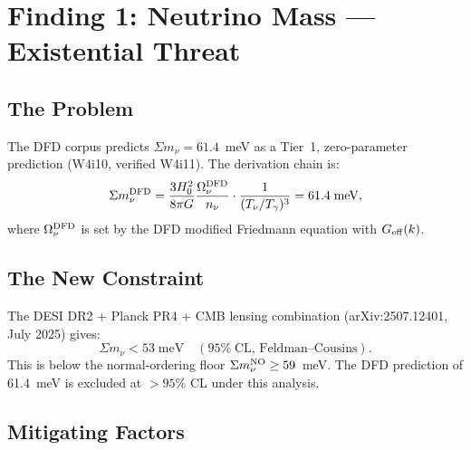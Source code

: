 \documentclass[11pt]{article}
\newcommand{\Geff}{G_{\rm eff}}
\newcommand{\Hzero}{H_0}
\begin{document}
\section{Finding 1: Neutrino Mass --- Existential Threat}
\label{sec:neutrino}

\subsection{The Problem}

The DFD corpus predicts $\Sigma m_\nu = 61.4$~meV as a Tier~1,
zero-parameter prediction (W4i10, verified W4i11).  The derivation
chain is:
\begin{equation}
\Sigma m_\nu^{\rm DFD} = \frac{3 \Hzero^2}{8\pi G}
\frac{\Omega_\nu^{\rm DFD}}{n_\nu}
\cdot \frac{1}{(T_\nu/T_\gamma)^3}
= 61.4 \;\text{meV},
\end{equation}
where $\Omega_\nu^{\rm DFD}$ is set by the DFD modified Friedmann
equation with $\Geff(k)$.

\subsection{The New Constraint}

The DESI DR2 + Planck PR4 + CMB lensing combination (arXiv:2507.12401,
July 2025) gives:
\begin{equation}
\Sigma m_\nu < 53 \;\text{meV} \quad (95\%\;\text{CL, Feldman--Cousins}).
\end{equation}
This is below the normal-ordering floor $\Sigma m_\nu^{\rm NO} \geq
59$~meV.  The DFD prediction of 61.4~meV is excluded at $> 95\%$ CL
under this analysis.

\subsection{Mitigating Factors}
\end{document}
